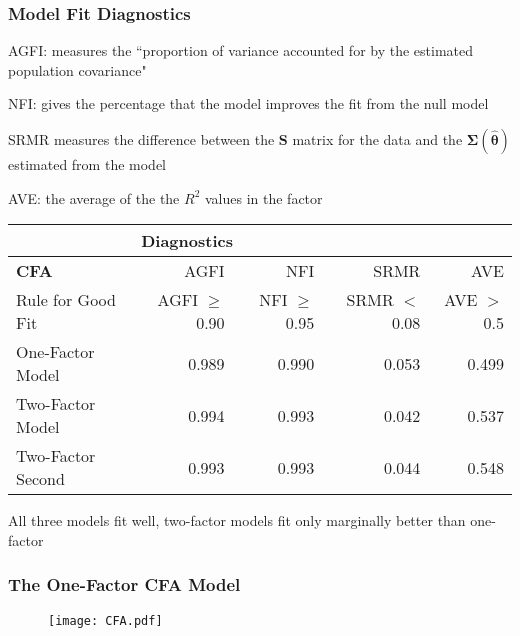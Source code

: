 \documentclass{beamer}
\begin{document}
\begin{frame}
\frametitle{Model Fit Diagnostics}
\itemize
\footnotesize
\item AGFI: measures the ``proportion of variance accounted for by the estimated population covariance"
\item NFI: gives the percentage that the model improves the fit from the null model
\item SRMR measures the difference between the $\mathbf{S}$ matrix for the data and the $\boldsymbol{\Sigma}(\hat{\boldsymbol{\theta}})$ estimated from the model
\item AVE: the average of the the $R^2$ values in the factor
\begin{table}[htb]
    \centering
    \tiny
    \begin{tabular}{l|r|r|r|r}
      & \multicolumn{4}{l}{\textbf{Diagnostics}} \\
     \hline
     \textbf{CFA} & AGFI & NFI & SRMR & AVE \\
     Rule for Good Fit & AGFI $\geq$ 0.90 & NFI $\geq$ 0.95 & SRMR $<$ 0.08  & AVE $>$0.5 \\
    \hline
    One-Factor Model & 0.989 & 0.990 & 0.053 & 0.499  \\
    Two-Factor Model & 0.994 & 0.993 & 0.042 & 0.537  \\
    Two-Factor Second & 0.993 & 0.993 & 0.044 & 0.548 \\
    \end{tabular}
    \label{diag}
\end{table}
\itemize
\item All three models fit well, two-factor models fit only marginally better than one-factor
\end{frame}

\begin{frame}
\frametitle{The One-Factor CFA Model}
\begin{figure}
\centering
  \texttt{[image: CFA.pdf]}
  \label{cfavis}
\end{figure}
\end{frame}
\end{document}
